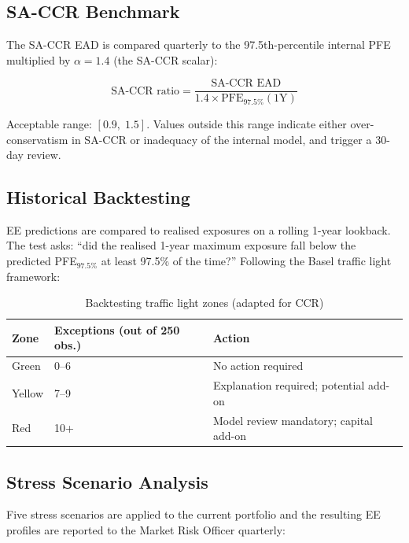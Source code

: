 \documentclass[11pt,a4paper]{article}
\begin{document}
\subsection{SA-CCR Benchmark}

The SA-CCR EAD is compared quarterly to the 97.5th-percentile internal PFE
multiplied by $\alpha = 1.4$ (the SA-CCR scalar):

\begin{equation}
  \text{SA-CCR ratio}
    = \frac{\text{SA-CCR EAD}}{1.4 \times \text{PFE}_{97.5\%}(1\text{Y})}
\end{equation}

Acceptable range: $[0.9,\; 1.5]$. Values outside this range indicate either
over-conservatism in SA-CCR or inadequacy of the internal model, and trigger
a 30-day review.

\subsection{Historical Backtesting}

EE predictions are compared to realised exposures on a rolling 1-year
lookback. The test asks: ``did the realised 1-year maximum exposure fall
below the predicted PFE$_{97.5\%}$ at least 97.5\% of the time?'' Following
the Basel traffic light framework:

\begin{table}[h!]
\centering
\begin{tabular}{@{}lll@{}}
\toprule
\textbf{Zone} & \textbf{Exceptions (out of 250 obs.)} & \textbf{Action} \\
\midrule
Green  & 0--6   & No action required \\
Yellow & 7--9   & Explanation required; potential add-on \\
Red    & 10+    & Model review mandatory; capital add-on \\
\bottomrule
\end{tabular}
\caption{Backtesting traffic light zones (adapted for CCR)}
\end{table}

\subsection{Stress Scenario Analysis}

Five stress scenarios are applied to the current portfolio and the resulting
EE profiles are reported to the Market Risk Officer quarterly:
\end{document}

